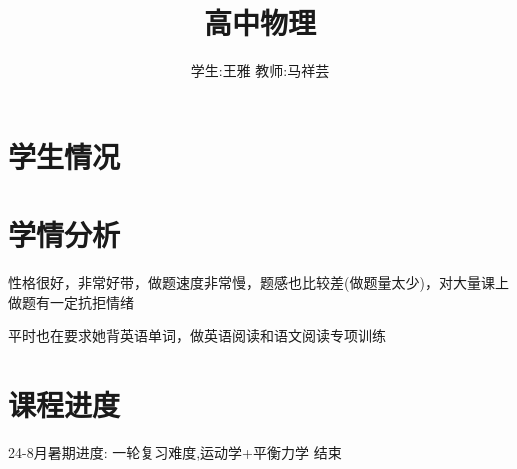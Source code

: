 \documentclass{article}
\title{高中物理}
\author{学生:\quad 王雅 \quad 教师:\quad 马祥芸}
\begin{document}
\maketitle
\tableofcontents
\newpage
{}

\section{学生情况}
\begin{center}
\end{center}

\section{学情分析}
性格很好，非常好带，做题速度非常慢，题感也比较差(做题量太少)，对大量课上做题有一定抗拒情绪

平时也在要求她背英语单词，做英语阅读和语文阅读专项训练

\vspace{2em}

\section{课程进度}
24-8月暑期进度: 一轮复习难度,运动学+平衡力学 结束
\end{document}
